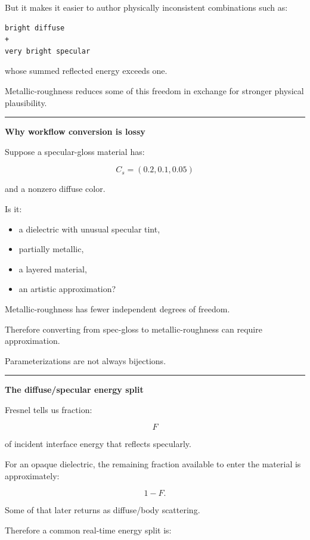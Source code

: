 But it makes it easier to author physically inconsistent combinations such as:

\begin{verbatim}
bright diffuse
+
very bright specular
\end{verbatim}

whose summed reflected energy exceeds one.

Metallic-roughness reduces some of this freedom in exchange for stronger physical plausibility.

\begin{center}\rule{0.5\linewidth}{0.5pt}\end{center}

\textbf{Why workflow conversion is lossy}

Suppose a specular-gloss material has:

\[
C_s=(0.2,0.1,0.05)
\]

and a nonzero diffuse color.

Is it:

\begin{itemize}
\tightlist
\item
  a dielectric with unusual specular tint,
\item
  partially metallic,
\item
  a layered material,
\item
  an artistic approximation?
\end{itemize}

Metallic-roughness has fewer independent degrees of freedom.

Therefore converting from spec-gloss to metallic-roughness can require approximation.

Parameterizations are not always bijections.

\begin{center}\rule{0.5\linewidth}{0.5pt}\end{center}

\textbf{The diffuse/specular energy split}

Fresnel tells us fraction:

\[
F
\]

of incident interface energy that reflects specularly.

For an opaque dielectric, the remaining fraction available to enter the material is approximately:

\[
1-F.
\]

Some of that later returns as diffuse/body scattering.

Therefore a common real-time energy split is:

